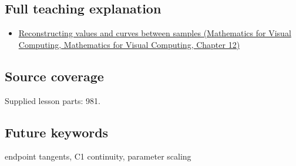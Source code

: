 \subsection{Full teaching explanation}\label{appendix-db3aef8f2fd6-full-teaching-explanation}

\begin{itemize}
\tightlist
\item
  \href{../02-Mathematics-for-Visual-Computing/main.pdf\#nameddest=02-foundations-ii-ch028-reconstructing-values-and-curves-between-samples}{Reconstructing values and curves between samples (Mathematics for Visual Computing, Mathematics for Visual Computing, Chapter 12)}
\end{itemize}

\subsection{Source coverage}\label{appendix-db3aef8f2fd6-source-coverage}

Supplied lesson parts: 981.

\subsection{Future keywords}\label{appendix-db3aef8f2fd6-future-keywords}

endpoint tangents, C1 continuity, parameter scaling
